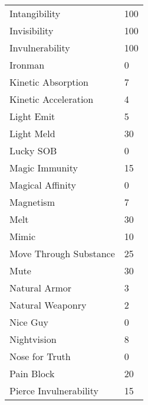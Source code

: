 \documentclass[twoside]{book}
\begin{document}
\begin{longtable}{p{1.25in}l}
  \raggedright
           Intangibility 
  &
   100 
  \tabularnewline
      
  \raggedright
           Invisibility 
  &
   100 
  \tabularnewline
      
  \raggedright
           Invulnerability 
  &
   100 
  \tabularnewline
      
  \raggedright
           Ironman 
  &
   0 
  \tabularnewline
      
  \raggedright
           Kinetic Absorption 
  &
   7 
  \tabularnewline
      
  \raggedright
           Kinetic Acceleration 
  &
   4 
  \tabularnewline
      
  \raggedright
           Light Emit 
  &
   5 
  \tabularnewline
      
  \raggedright
           Light Meld 
  &
   30 
  \tabularnewline
      
  \raggedright
           Lucky SOB 
  &
   0 
  \tabularnewline
      
  \raggedright
           Magic Immunity 
  &
   15 
  \tabularnewline
      
  \raggedright
           Magical Affinity 
  &
   0 
  \tabularnewline
      
  \raggedright
           Magnetism 
  &
   7 
  \tabularnewline
      
  \raggedright
           Melt 
  &
   30 
  \tabularnewline
      
  \raggedright
           Mimic 
  &
   10 
  \tabularnewline
      
  \raggedright
           Move Through Substance 
  &
   25 
  \tabularnewline
      
  \raggedright
           Mute 
  &
   30 
  \tabularnewline
      
  \raggedright
           Natural Armor 
  &
   3 
  \tabularnewline
      
  \raggedright
           Natural Weaponry 
  &
   2 
  \tabularnewline
      
  \raggedright
           Nice Guy 
  &
   0 
  \tabularnewline
      
  \raggedright
           Nightvision 
  &
   8 
  \tabularnewline
      
  \raggedright
           Nose for Truth 
  &
   0 
  \tabularnewline
      
  \raggedright
           Pain Block 
  &
   20 
  \tabularnewline
      
  \raggedright
           Pierce Invulnerability 
  &
   15 
  \tabularnewline
      

\end{longtable}
\end{document}
